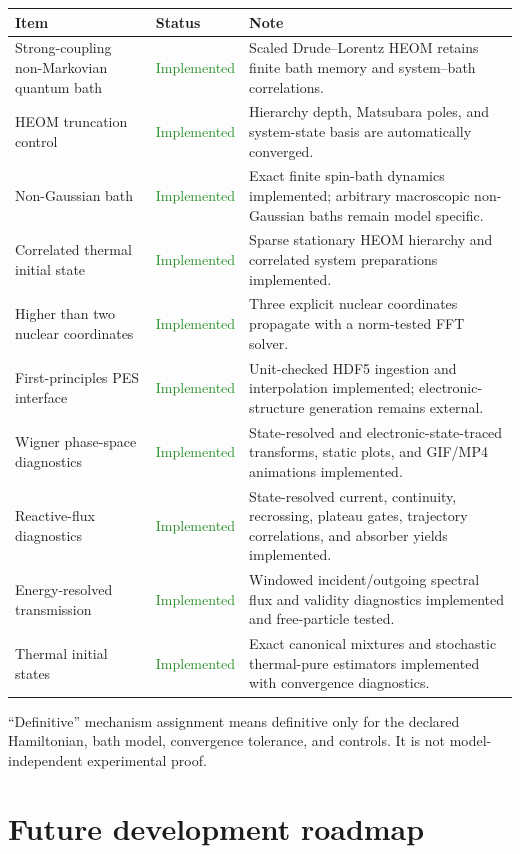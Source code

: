 \documentclass[11pt]{article}
\newcommand{\statusdone}{\textcolor{ForestGreen}{Implemented}}
\begin{document}
\newpage
\begingroup\setlength{\parskip}{0pt}
\begin{tabular}{>{\raggedright\arraybackslash}p{}>{\raggedright\arraybackslash}p{}>{\raggedright\arraybackslash}p{}}
\toprule
Item & Status & Note\\
\midrule
Strong-coupling non-Markovian quantum bath & \statusdone & Scaled Drude--Lorentz HEOM retains finite bath memory and system--bath correlations.\\
HEOM truncation control & \statusdone & Hierarchy depth, Matsubara poles, and system-state basis are automatically converged.\\
Non-Gaussian bath & \statusdone & Exact finite spin-bath dynamics implemented; arbitrary macroscopic non-Gaussian baths remain model specific.\\
Correlated thermal initial state & \statusdone & Sparse stationary HEOM hierarchy and correlated system preparations implemented.\\
Higher than two nuclear coordinates & \statusdone & Three explicit nuclear coordinates propagate with a norm-tested FFT solver.\\
First-principles PES interface & \statusdone & Unit-checked HDF5 ingestion and interpolation implemented; electronic-structure generation remains external.\\
Wigner phase-space diagnostics & \statusdone & State-resolved and electronic-state-traced transforms, static plots, and GIF/MP4 animations implemented.\\
Reactive-flux diagnostics & \statusdone & State-resolved current, continuity, recrossing, plateau gates, trajectory correlations, and absorber yields implemented.\\
Energy-resolved transmission & \statusdone & Windowed incident/outgoing spectral flux and validity diagnostics implemented and free-particle tested.\\
Thermal initial states & \statusdone & Exact canonical mixtures and stochastic thermal-pure estimators implemented with convergence diagnostics.\\
\bottomrule
\end{tabular}
\endgroup

``Definitive'' mechanism assignment means definitive only for the declared
Hamiltonian, bath model, convergence tolerance, and controls. It is not
model-independent experimental proof.

\section{Future development roadmap}
\end{document}
